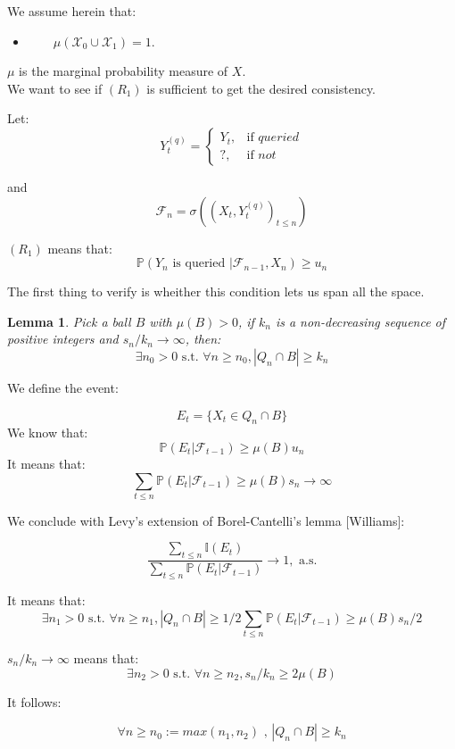 \documentclass[onecolumn,12pt]{article}
\newtheorem{lemma}[theorem]{Lemma}
\newenvironment{proof}[1][Proof]{\begin{trivlist}
\item[\hskip \labelsep {\bfseries #1}]}{\end{trivlist}}
\begin{document}
We assume herein that:

\begin{itemize}
\item[$(A_1)$] \ \ \ \ $\mu(\mathscr{X}_0 \cup \mathscr{X}_1)=1$.
\end{itemize}

$\mu$ is the marginal probability measure of $X$.\\

We want to see if $(R_1)$ is sufficient to get the desired consistency.

Let:
$$Y^{(q)}_t=\begin{cases}
Y_t, & \text{if }queried \\
? , & \text{if }not 
\end{cases}$$

and $$\mathscr{F}_n=\sigma((X_t,Y^{(q)}_t)_{t \leq n})$$

$(R_1)$ means that:
\begin{equation}
\mathbb{P}(Y_n \text{ is queried } | \mathscr{F}_{n-1},X_n) \geq u_n
\end{equation}

The first thing to verify is wheither this condition lets us span all the space.

\begin{lemma}
Pick a ball $B$ with $\mu(B)>0$, if $k_n$ is a non-decreasing sequence of positive integers and $s_n/k_n \rightarrow \infty$, then:
$$\exists n_0>0 \text{ s.t. } \forall n\geq n_0 , |Q_n \cap B| \geq k_n$$
\end{lemma}

\begin{proof}
We define the event:

$$E_t=\{X_t \in Q_n \cap B\}$$
We know that: 
$$\mathbb{P}(E_t|\mathscr{F}_{t-1}) \geq \mu(B) u_n$$
It means that: 
$$\sum_{t \leq n} \mathbb{P}(E_t|\mathscr{F}_{t-1}) \geq \mu(B) s_n \rightarrow \infty$$

We conclude with Levy's extension of Borel-Cantelli's lemma [Williams]: 

$$\frac{\sum_{t\leq n}\mathbb{I}(E_t)}{\sum_{t\leq n }\mathbb{P}(E_t|\mathscr{F}_{t-1})} \rightarrow 1, \text{ a.s.}$$

It means that: 
$$\exists n_1>0 \text{ s.t. } \forall n\geq n_1 , |Q_n \cap B| \geq 1/2 \sum_{t\leq n }\mathbb{P}(E_t|\mathscr{F}_{t-1}) \geq  \mu(B) s_n/2 $$

$s_n/k_n \rightarrow \infty$ means that:
$$\exists n_2>0 \text{ s.t. } \forall n \geq n_2 , s_n/k_n  \geq 2\mu(B)$$

It follows:

$$\forall n \geq n_0:=max(n_1,n_2) \text{ , } |Q_n \cap B| \geq k_n$$

\end{proof}
\end{document}
